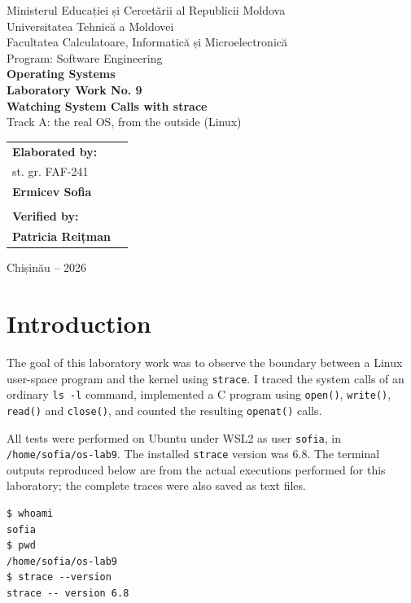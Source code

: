 \documentclass[12pt,a4paper]{article}
\begin{document}
\begin{titlepage}
\begin{center}
{\large Ministerul Educației și Cercetării al Republicii Moldova}\\[0.3cm]
{\large Universitatea Tehnică a Moldovei}\\[0.3cm]
{\large Facultatea Calculatoare, Informatică și Microelectronică}\\[0.3cm]
{\large Program: Software Engineering}\\[2.3cm]
{\Large \textbf{Operating Systems}}\\[0.8cm]
{\LARGE \textbf{Laboratory Work No. 9}}\\[0.5cm]
{\Large \textbf{Watching System Calls with strace}}\\[0.35cm]
{\large Track A: the real OS, from the outside (Linux)}
\vfill
\begin{flushright}
\begin{tabular}{ll}
\textbf{Elaborated by:} & \\
st. gr. FAF-241 & \\
\textbf{Ermicev Sofia} & \\
\\
\textbf{Verified by:} & \\
\textbf{Patricia Reițman} &
\end{tabular}
\end{flushright}
\vfill
{\large Chișinău -- 2026}
\end{center}
\end{titlepage}
\tableofcontents
\newpage
\section{Introduction}
The goal of this laboratory work was to observe the boundary between a Linux user-space program and the kernel using \texttt{strace}. I traced the system calls of an ordinary \texttt{ls -l} command, implemented a C program using \texttt{open()}, \texttt{write()}, \texttt{read()} and \texttt{close()}, and counted the resulting \texttt{openat()} calls.

All tests were performed on Ubuntu under WSL2 as user \texttt{sofia}, in \texttt{/home/sofia/os-lab9}. The installed \texttt{strace} version was 6.8. The terminal outputs reproduced below are from the actual executions performed for this laboratory; the complete traces were also saved as text files.

\begin{lstlisting}[caption={Environment check and strace version}]
$ whoami
sofia
$ pwd
/home/sofia/os-lab9
$ strace --version
strace -- version 6.8
\end{lstlisting}
\end{document}
